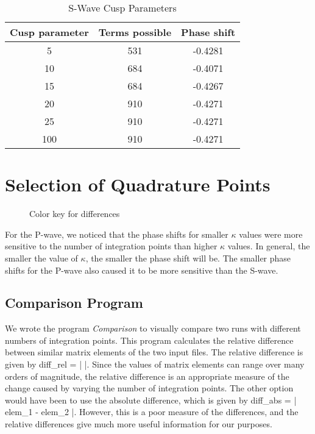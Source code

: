 \documentclass[Dissertation.tex]{subfiles}
\begin{document}
\begin{table}[H]
\begin{center}
\begin{tabular}{c c c}
\toprule
Cusp parameter & Terms possible & Phase shift \\
\midrule
 5 & 531 & -0.4281 \\
10 & 684 & -0.4071 \\
15 & 684 & -0.4267 \\
20 & 910 & -0.4271 \\
25 & 910 & -0.4271 \\
100 & 910 & -0.4271 \\
\bottomrule
\end{tabular}
\caption{S-Wave Cusp Parameters}
\label{tab:SWaveCuspParameters}
\end{center}
\end{table}


\section{Selection of Quadrature Points}
\label{sec:SelQuadPoints2}

\begin{figure}[H]
	\caption{Color key for differences}
	\label{fig:ColorKey}
\end{figure}

For the P-wave, we noticed that the phase shifts for smaller $\kappa$ values were more sensitive to the number of integration points than higher $\kappa$ values. In general, the smaller the value of $\kappa$, the smaller the phase shift will be. The smaller phase shifts for the P-wave also caused it to be more sensitive than the S-wave.

\subsection{Comparison Program}
We wrote the program \emph{Comparison} to visually compare two runs with different numbers of integration points. This program calculates the relative difference between similar matrix elements of the two input files. The relative difference is given by
\beq
diff_{rel} = \left|  \right|.
\eeq
Since the values of matrix elements can range over many orders of magnitude, the relative difference is an appropriate measure of the change caused by varying the number of integration points. The other option would have been to use the absolute difference, which is given by 
\beq
diff_{abs} = \left| elem_1 - elem_2 \right|.
\eeq
However, this is a poor measure of the differences, and the relative differences give much more useful information for our purposes.
\end{document}
